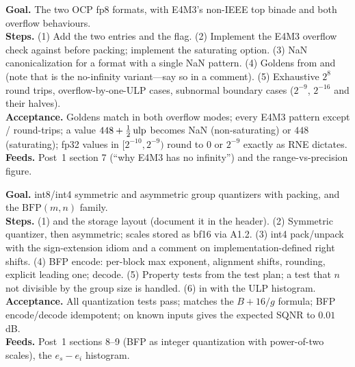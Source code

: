 \textbf{Goal.} The two OCP fp8 formats, with E4M3's non-IEEE top binade and both overflow behaviours.\\
\textbf{Steps.} (1) Add the two  entries and the  flag. (2) Implement the E4M3 overflow check against  before packing; implement the saturating option. (3) NaN canonicalization for a format with a single NaN pattern. (4) Goldens from  and  (note that  is the no-infinity variant---say so in a comment). (5) Exhaustive $2^8$ round trips, overflow-by-one-ULP cases, subnormal boundary cases ($2^{-9}$, $2^{-16}$ and their halves).\\
\textbf{Acceptance.} Goldens match in both overflow modes; every E4M3 pattern except / round-trips; a value $448 + \tfrac12\operatorname{ulp}$ becomes NaN (non-saturating) or $448$ (saturating); fp32 values in $[2^{-10}, 2^{-9})$ round to $0$ or $2^{-9}$ exactly as RNE dictates.\\
\textbf{Feeds.} Post~1 section 7 (``why E4M3 has no infinity'') and the range-vs-precision figure.

\textbf{Goal.} int8/int4 symmetric and asymmetric group quantizers with packing, and the $\mathrm{BFP}(m,n)$ family.\\
\textbf{Steps.} (1)  and the storage layout (document it in the header). (2) Symmetric quantizer, then asymmetric; scales stored as bf16 via A1.2. (3) int4 pack/unpack with the sign-extension idiom and a comment on implementation-defined right shifts. (4) BFP encode: per-block max exponent, alignment shifts, rounding, explicit leading one; decode. (5) Property tests from the test plan; a test that $n$ not divisible by the group size is handled. (6)  in  with the ULP histogram.\\
\textbf{Acceptance.} All quantization tests pass;  matches the $B + 16/g$ formula; BFP encode/decode idempotent;  on known inputs gives the expected SQNR to $0.01$ dB.\\
\textbf{Feeds.} Post~1 sections 8--9 (BFP as integer quantization with power-of-two scales), the $e_s - e_i$ histogram.

